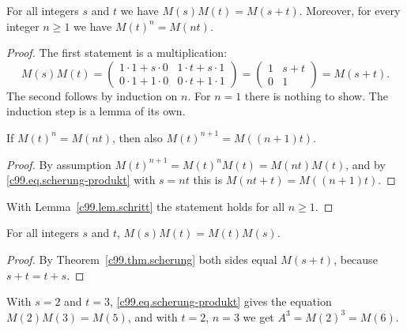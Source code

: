 \begin{theorem}\label{c99.thm.scherung}
  For all integers $s$ and $t$ we have $M(s)M(t) = M(s+t)$. Moreover, for every
  integer $n \geq 1$ we have $M(t)^n = M(nt)$.
\end{theorem}
\begin{proof}
  The first statement is a multiplication:
  \begin{equation}\label{c99.eq.scherung-produkt}
    M(s)M(t)
    = \begin{pmatrix} 1\cdot 1 + s\cdot 0 & 1\cdot t + s\cdot 1 \\
                      0\cdot 1 + 1\cdot 0 & 0\cdot t + 1\cdot 1 \end{pmatrix}
    = \begin{pmatrix} 1 & s+t \\ 0 & 1 \end{pmatrix}
    = M(s+t).
  \end{equation}
  The second follows by induction on $n$. For $n = 1$ there is nothing to show.
  The induction step is a lemma of its own.
  \begin{lemma}\label{c99.lem.schritt}
    If $M(t)^n = M(nt)$, then also $M(t)^{n+1} = M((n+1)t)$.
  \end{lemma}
  \begin{proof}
    By assumption $M(t)^{n+1} = M(t)^n M(t) = M(nt)M(t)$, and by
    \eqref{c99.eq.scherung-produkt} with $s = nt$ this is $M(nt + t) = M((n+1)t)$.
  \end{proof}
  With Lemma~\ref{c99.lem.schritt} the statement holds for all $n \geq 1$.
\end{proof}

\begin{corollary}\label{c99.cor.vertauschen}
  For all integers $s$ and $t$, $M(s)M(t) = M(t)M(s)$.
\end{corollary}
\begin{proof}
  By Theorem~\ref{c99.thm.scherung} both sides equal $M(s+t)$, because
  $s + t = t + s$.
\end{proof}

\begin{example}[Numbers]\label{c99.ex.zahlen}
  With $s = 2$ and $t = 3$, \eqref{c99.eq.scherung-produkt} gives the equation
  $M(2)M(3) = M(5)$, and with $t = 2$, $n = 3$ we get $A^3 = M(2)^3 = M(6)$.
\end{example}

